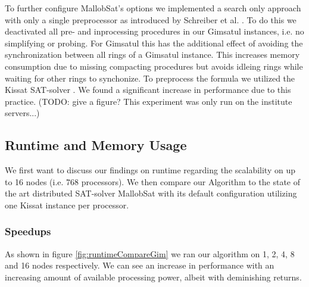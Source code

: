 \documentclass[12pt,a4paper,twoside]{scrartcl}
\numberwithin{equation}{section}
\begin{document}
To further configure MallobSat's options we implemented a search only approach with only a single preprocessor as introduced by Schreiber et al. \cite{searchOnlyPaper}. To do this we deactivated all pre- and inprocessing procedures in our Gimsatul instances, i.e. no simplifying or probing. For Gimsatul this has the additional effect of avoiding the synchronization between all rings of a Gimsatul instance. This increases memory consumption due to missing compacting procedures but avoids idleing rings while waiting for other rings to synchonize. To preprocess the formula we utilized the Kissat SAT-solver \cite{kissat}. We found a significant increase in performance due to this practice. (TODO: give a figure? This experiment was only run on the institute servers...)

\subsection{Runtime and Memory Usage}

We first want to discuss our findings on runtime regarding the scalability on up to 16 nodes (i.e. 768 processors). We then compare our Algorithm to the state of the art distributed SAT-solver MallobSat with its default configuration utilizing one Kissat instance per processor.

\subsubsection{Speedups}

As shown in figure \ref{fig:runtimeCompareGim} we ran our algorithm on 1, 2, 4, 8 and 16 nodes respectively. We can see an increase in performance with an increasing amount of available processing power, albeit with deminishing returns.
\end{document}
